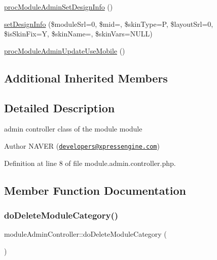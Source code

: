 \begin{DoxyCompactItemize}
\hyperlink{classmoduleAdminController_ae54d4745ef9b34c46bb3c8943314ee8d}{proc\+Module\+Admin\+Set\+Design\+Info} ()
\item 
\hyperlink{classmoduleAdminController_a1ff90fe08fe1f3d67783ff81b91ee3b2}{set\+Design\+Info} (\$module\+Srl=0, \$mid=\textquotesingle{}\textquotesingle{}, \$skin\+Type=\textquotesingle{}P\textquotesingle{}, \$layout\+Srl=0, \$is\+Skin\+Fix=\textquotesingle{}Y\textquotesingle{}, \$skin\+Name=\textquotesingle{}\textquotesingle{}, \$skin\+Vars=N\+U\+LL)
\item 
\hyperlink{classmoduleAdminController_a70143beac165b7795868db95f0d4b4e6}{proc\+Module\+Admin\+Update\+Use\+Mobile} ()
\end{DoxyCompactItemize}
\subsection*{Additional Inherited Members}


\subsection{Detailed Description}
admin controller class of the module module 

\begin{DoxyAuthor}{Author}
N\+A\+V\+ER (\href{mailto:developers@xpressengine.com}{\tt developers@xpressengine.\+com}) 
\end{DoxyAuthor}


Definition at line 8 of file module.\+admin.\+controller.\+php.



\subsection{Member Function Documentation}
\mbox{\label{classmoduleAdminController_a80e37ec16dc036325888cb3890b51575}} 
\subsubsection{\texorpdfstring{do\+Delete\+Module\+Category()}{doDeleteModuleCategory()}}
{\footnotesize\ttfamily module\+Admin\+Controller\+::do\+Delete\+Module\+Category (\begin{DoxyParamCaption}{ }\end{DoxyParamCaption})}



